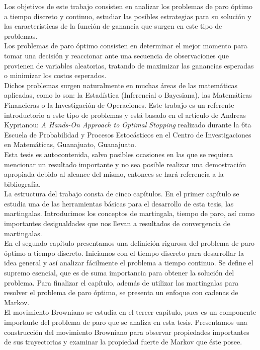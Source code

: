 Los objetivos de este trabajo consisten en analizar los problemas de paro óptimo a tiempo discreto y continuo, estudiar las posibles estrategias para su solución y las características de la función de ganancia que surgen en este tipo de problemas. \\

Los problemas de paro óptimo consisten en determinar el mejor momento para tomar una decisión y reaccionar ante una secuencia de observaciones que provienen de variables aleatorias, tratando de maximizar las ganancias esperadas o minimizar los costos esperados. \\ 

Dichos problemas surgen naturalmente en muchas áreas de las matemáticas aplicadas, como lo son: la Estadística (Inferencial o Bayesiana), las Matemáticas Financieras o la Investigación de Operaciones. Este trabajo es un referente introductorio a este tipo de problemas y está basado en el artículo de Andreas Kyprianou: \textit{A Hands-On Approach to Optimal Stopping} realizado durante la 6ta Escuela de Probabilidad y Procesos Estocásticos en el Centro de Investigaciones en Matemáticas, Guanajuato, Guanajuato. \\

Esta tesis es autocontenida, salvo posibles ocasiones en las que se requiera mencionar un resultado importante y no sea posible realizar una demostración apropiada debido al alcance del mismo, entonces se hará referencia a la bibliografía. \\

La estructura del trabajo consta de cinco capítulos. En el primer capítulo se estudia una de las herramientas básicas para el desarrollo de esta tesis, las martingalas. Introducimos los conceptos de martingala, tiempo de paro, así como importantes desigualdades que nos llevan a resultados de convergencia de martingalas. \\

En el segundo capítulo presentamos una definición rigurosa del problema de paro óptimo a tiempo discreto. Iniciamos con el tiempo discreto para desarrollar la idea general y así analizar fácilmente el problema a tiempo continuo. Se define el supremo esencial, que es de suma importancia para obtener la solución del problema. Para finalizar el capítulo, además de utilizar las martingalas para resolver el problema de paro óptimo, se presenta un enfoque con cadenas de Markov. \\

El movimiento Browniano se estudia en el tercer capítulo, pues es un componente importante del problema de paro que se analiza en esta tesis. Presentamos una construcción del movimiento Browniano para observar propiedades importantes de sus trayectorias y examinar la propiedad fuerte de Markov que éste posee. \\

